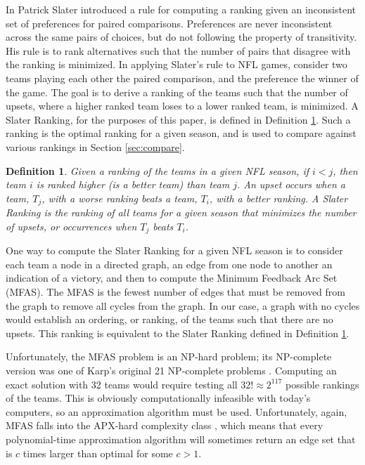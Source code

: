 \documentclass[11pt]{article}
\newtheorem{definition}{Definition}
\begin{document}
In \cite{biometrika_slater} Patrick Slater introduced a rule for computing a ranking given an inconsistent set of preferences for paired comparisons. Preferences are never inconsistent across the same pairs of choices, but do not following the property of transitivity. His rule is to rank alternatives such that the number of pairs that disagree with the ranking is minimized. In applying Slater's rule to NFL games, consider two teams playing each other the paired comparison, and the preference the winner of the game. The goal is to derive a ranking of the teams such that the number of upsets, where a higher ranked team loses to a lower ranked team, is minimized. A Slater Ranking, for the purposes of this paper, is defined in Definition \ref{def:slater_ranking}. Such a ranking is the optimal ranking for a given season, and is used to compare against various rankings in Section \ref{sec:compare}.

\begin{definition}\label{def:slater_ranking}
Given a ranking of the teams in a given NFL season, if $i < j$, then team $i$ is ranked higher (is a better team) than team $j$. An upset occurs when a team, $T_j$, with a worse ranking beats a team, $T_i$, with a better ranking. A Slater Ranking is the ranking of all teams for a given season that minimizes the number of upsets, or occurrences when $T_j$ beats $T_i$.
\end{definition}

One way to compute the Slater Ranking for a given NFL season is to consider each team a node in a directed graph, an edge from one node to another an indication of a victory, and then to compute the Minimum Feedback Arc Set (MFAS). The MFAS is the fewest number of edges that must be removed from the graph to remove all cycles from the graph. In our case, a graph with no cycles would establish an ordering, or ranking, of the teams such that there are no upsets. This ranking is equivalent to the Slater Ranking defined in Definition \ref{def:slater_ranking}.

Unfortunately, the MFAS problem is an NP-hard problem; its NP-complete version was one of Karp's original 21 NP-complete problems \cite{karp_complexity}. Computing an exact solution with 32 teams would require testing all $32! \approx 2^{117}$ possible rankings of the teams. This is obviously computationally infeasible with today's computers, so an approximation algorithm must be used. Unfortunately, again, MFAS falls into the APX-hard complexity class \cite{kann_approx}, which means that every polynomial-time approximation algorithm will sometimes return an edge set that is $c$ times larger than optimal for some $c > 1$.
\end{document}
